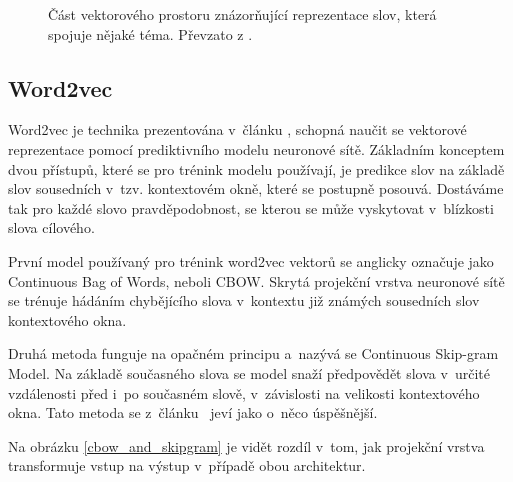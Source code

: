 \begin{figure}[hbt]
	\centering
	\caption{Část vektorového prostoru znázorňující reprezentace slov, která spojuje nějaké téma. Převzato z \cite{online:word_embedds}.}
	\label{word_embeddings}
\end{figure}

\subsection{Word2vec}

Word2vec je technika prezentována v~článku \cite{mikolov2013embeddings}, schopná naučit se vektorové reprezentace pomocí prediktivního modelu neuronové sítě. Základním konceptem dvou přístupů, které se pro trénink modelu používají, je predikce slov na základě slov sousedních v~tzv. kontextovém okně, které se postupně posouvá. Dostáváme tak pro každé slovo pravděpodobnost, se kterou se může vyskytovat v~blízkosti slova cílového.\par
První model používaný pro trénink word2vec vektorů se anglicky označuje jako Continuous Bag of Words, neboli CBOW. Skrytá projekční vrstva neuronové sítě se trénuje hádáním chybějícího slova v~kontextu již známých sousedních slov kontextového okna.\par
Druhá metoda funguje na opačném principu a~nazývá se Continuous Skip-gram Model. Na základě současného slova se model snaží předpovědět slova v~určité vzdálenosti před i~po současném slově, v~závislosti na velikosti kontextového okna. Tato metoda se z~článku~\cite{mikolov2013embeddings} jeví jako o~něco úspěšnější.\par
Na obrázku \ref{cbow_and_skipgram} je vidět rozdíl v~tom, jak projekční vrstva transformuje vstup na výstup v~případě obou architektur.


